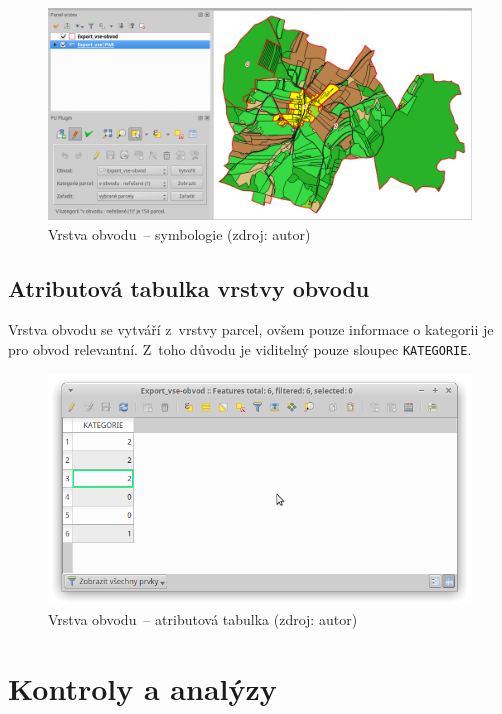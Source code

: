 	\begin{figure}[H] \centering
		\includegraphics[width=1.0\textwidth]{./pictures/symbologie_obvod.png}
		\caption[Vrstva obvodu~– symbologie]{Vrstva obvodu~–
symbologie (zdroj: autor)}
		\label{fig:manual_symbologie_obvod}
 	\end{figure}

\subsection{Atributová tabulka vrstvy obvodu}
\label{manual_editace_tabulka}

Vrstva obvodu se vytváří z~vrstvy parcel, ovšem pouze informace o
kategorii je pro obvod relevantní. Z~toho důvodu je viditelný pouze
sloupec \texttt{KATEGORIE}.

	\begin{figure}[H] \centering
		\includegraphics[width=.7\textwidth]{./pictures/editace-tabulka.png}
		\caption[Vrstva obvodu~– atributová tabulka]{Vrstva
obvodu~– atributová tabulka (zdroj: autor)}
		\label{fig:manual_tabulka_obvod}
 	\end{figure}

\newpage

\section{Kontroly a analýzy}
\label{manual_kontroly_analyzy}

